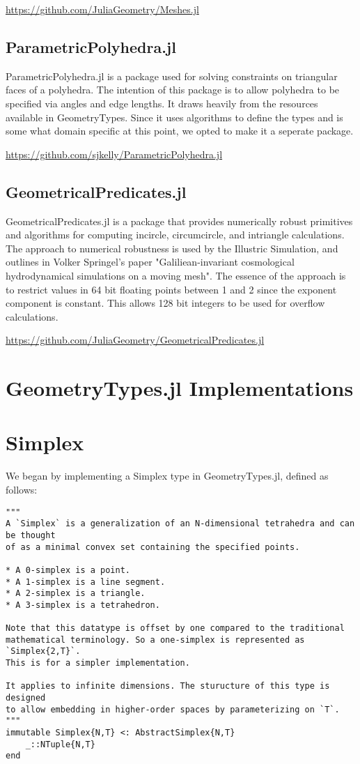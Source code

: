 \url{https://github.com/JuliaGeometry/Meshes.jl}

\subsection{ParametricPolyhedra.jl}

ParametricPolyhedra.jl is a package used for solving constraints on
triangular faces of a polyhedra. The intention of this package
is to allow polyhedra to be specified via angles and edge lengths.
It draws heavily from the resources available in GeometryTypes. Since
it uses algorithms to define the types and is some what domain
specific at this point, we opted to make it a seperate package.

\url{https://github.com/sjkelly/ParametricPolyhedra.jl}

\subsection{GeometricalPredicates.jl}

GeometricalPredicates.jl is a package that provides numerically
robust primitives and algorithms for computing incircle, circumcircle, and
intriangle calculations. The approach to numerical robustness is used by
the Illustric Simulation, and outlines in Volker Springel's paper
"Galiliean-invariant cosmological hydrodynamical simulations on a moving mesh"\cite{Springel_2010}.
The essence of the approach is to restrict values in 64 bit floating points
between 1 and 2 since the exponent component is constant. This allows
128 bit integers to be used for overflow calculations.

\url{https://github.com/JuliaGeometry/GeometricalPredicates.jl}

\section{GeometryTypes.jl Implementations}

\section{Simplex}

We began by implementing a Simplex type in GeometryTypes.jl,
defined as follows:

\begin{lstlisting}
"""
A `Simplex` is a generalization of an N-dimensional tetrahedra and can be thought
of as a minimal convex set containing the specified points.

* A 0-simplex is a point.
* A 1-simplex is a line segment.
* A 2-simplex is a triangle.
* A 3-simplex is a tetrahedron.

Note that this datatype is offset by one compared to the traditional
mathematical terminology. So a one-simplex is represented as `Simplex{2,T}`.
This is for a simpler implementation.

It applies to infinite dimensions. The sturucture of this type is designed
to allow embedding in higher-order spaces by parameterizing on `T`.
"""
immutable Simplex{N,T} <: AbstractSimplex{N,T}
    _::NTuple{N,T}
end
\end{lstlisting}


